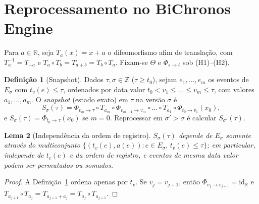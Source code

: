\documentclass[11pt, a4paper]{article}
\theoremstyle{definition}
\newtheorem{definicao}{Definição}[section]
\theoremstyle{plain}
\newtheorem{lema}[definicao]{Lema}
\theoremstyle{remark}
\begin{document}
\section{Reprocessamento no BiChronos Engine}\label{sec:4}

Para $a \in \mathbb{R}$, seja $T_a(x) = x + a$ o difeomorfismo afim de translação, com $T_a^{-1} = T_{-a}$ e $T_a \circ T_b = T_{a+b} = T_b \circ T_a$. Fixam-se $\Theta$ e $\Phi_{s \to t}$ sob (H1)--(H2).

\begin{definicao}[Snapshot]\label{def:4.1}
Dados $\tau, \sigma \in \mathbb{Z}$ ($\tau \ge t_0$), sejam $e_1, \dots, e_m$ os eventos de $E_\sigma$ com $t_v(e) \le \tau$, ordenados por data valor $t_0 < v_1 \le \dots \le v_m \le \tau$, com valores $a_1, \dots, a_m$. O \emph{snapshot} (estado exato) em $\tau$ na versão $\sigma$ é
\[
S_\sigma(\tau) = \Phi_{v_m \to \tau} \circ T_{a_m} \circ \Phi_{v_{m-1} \to v_m} \circ \dots \circ T_{a_1} \circ \Phi_{t_0 \to v_1}(x_0),
\]
e $S_\sigma(\tau) = \Phi_{t_0 \to \tau}(x_0)$ se $m = 0$. Reprocessar em $\sigma' > \sigma$ é calcular $S_{\sigma'}(\tau)$.
\end{definicao}

\begin{lema}[Independência da ordem de registro]\label{lem:4.2}
$S_\sigma(\tau)$ depende de $E_\sigma$ somente através do multiconjunto $\{(t_v(e), a(e)) : e \in E_\sigma,\, t_v(e) \le \tau\}$; em particular, independe de $t_c(e)$ e da ordem de registro, e eventos de mesma data valor podem ser permutados ou somados.
\end{lema}
\begin{proof}
A Definição~\ref{def:4.1} ordena apenas por $t_v$. Se $v_j = v_{j+1}$, então $\Phi_{v_j \to v_{j+1}} = \mathrm{id}_{\mathbb{R}}$ e $T_{a_{j+1}} \circ T_{a_j} = T_{a_{j+1} + a_j} = T_{a_j} \circ T_{a_{j+1}}$.
\end{proof}
\end{document}

